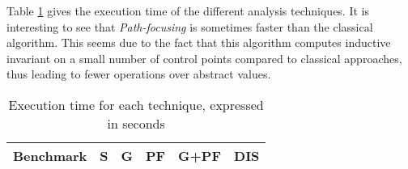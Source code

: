 \documentclass{entcs}
\begin{document}
Table \ref{tab:time} gives the execution time of the different analysis
techniques. It is interesting to see that
\emph{Path-focusing} is sometimes faster than the classical
algorithm.
This seems due to the fact that this algorithm
computes inductive invariant on a small number of control points compared to
classical approaches, thus leading to fewer operations over abstract values.


\begin{table}[!tb]
\begin{center}\small
\begin{tabular}{|l|r|r|r|r|r|} \hline
	\multicolumn{1}{|c|}{Benchmark} &
        \multicolumn{1}{c|}{\textbf{S}} &
        \multicolumn{1}{c|}{\textbf{G}} &
        \multicolumn{1}{c|}{\textbf{PF}} &
        \multicolumn{1}{c|}{\textbf{G+PF}} &
	\multicolumn{1}{c|}{\textbf{DIS}} \\ \hline
	 \hline
\end{tabular}
\end{center}
\caption{Execution time for each technique, expressed in seconds}
\label{tab:time}
\end{table}
\end{document}
